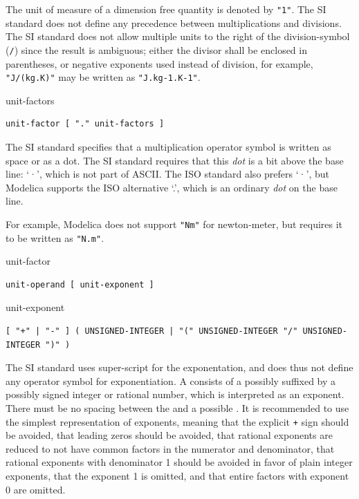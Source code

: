 The unit of measure of a dimension free quantity is denoted by \lstinline!"1"!.
The SI standard does not define any precedence between multiplications and divisions.
The SI standard does not allow multiple units to the right of the division-symbol (\lstinline!/!) since the result is ambiguous; either the divisor shall be enclosed in parentheses, or negative exponents used instead of division, for example, \lstinline!"J/(kg.K)"! may be written as \lstinline!"J.kg-1.K-1"!.

\begin{production}{unit-factors}
\begin{lstlisting}
unit-factor [ "." unit-factors ]
\end{lstlisting}
\end{production}

The SI standard specifies that a multiplication operator symbol is written as space or as a dot.
The SI standard requires that this \emph{dot} is a bit above the base line: `·', which is not part of ASCII.
The ISO standard also prefers `·', but Modelica supports the ISO alternative `.', which is an ordinary \emph{dot} on the base line.

For example, Modelica does not support \lstinline!"Nm"! for newton-meter, but requires it to be written as \lstinline!"N.m"!.

\begin{production}{unit-factor}
\begin{lstlisting}
unit-operand [ unit-exponent ]
\end{lstlisting}
\end{production}

\begin{production}{unit-exponent}
\begin{lstlisting}
[ "+" | "-" ] ( UNSIGNED-INTEGER | "(" UNSIGNED-INTEGER "/" UNSIGNED-INTEGER ")" )
\end{lstlisting}
\end{production}

The SI standard uses super-script for the exponentation, and does thus not define any operator symbol for exponentiation.
A  consists of a  possibly suffixed by a possibly signed integer or rational number, which is interpreted as an exponent.
There must be no spacing between the  and a possible .
It is recommended to use the simplest representation of exponents, meaning that the explicit \lstinline!+! sign should be avoided, that leading zeros should be avoided, that rational exponents are reduced to not have common factors in the numerator and denominator, that rational exponents with denominator 1 should be avoided in favor of plain integer exponents, that the exponent 1 is omitted, and that entire factors with exponent 0 are omitted.

